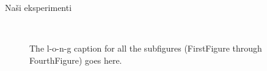 \documentclass[xcolor=dvipsnames,compress]{beamer}
\begin{document}
\begin{frame}{Naši eksperimenti}
%
\begin{figure}[ht!]
    \label{fig:subfigures}
    \begin{center}
        \\ %
%
    \end{center}
   \caption{%
        The l-o-n-g caption for all the subfigures
        (FirstFigure through FourthFigure) goes here.
     }%
\end{figure}
\end{frame}
\end{document}

